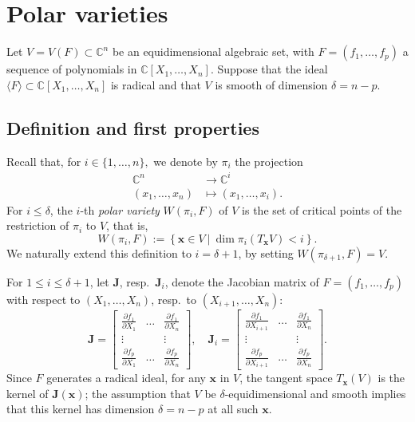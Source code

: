 \documentclass[12pt]{article}
\def\xb{{\bm x}}
\def\pa{\partial}
\def\C{\mathbb{C}}
\def\Wi{W(\pi_i,F)}
\begin{document}
\section{Polar varieties}

Let $V=V(F)\subset \C^n$ be an equidimensional algebraic set, with $F
= (f_1,\hdots,f_p)$ a sequence of polynomials in
$\C[X_1,\hdots,X_n]$. Suppose that the ideal $\langle F \rangle
\subset \C[X_1,\hdots,X_n]$ is radical and that $V$ is smooth of
dimension $\delta= n-p$.


\subsection{Definition and first properties}

Recall that, for $i \in \{1,\hdots,n\},$ we denote by $\pi_i$ the
projection
%
\begin{align*}
  \C^n &\rightarrow \C^i \\
  (x_1,\hdots,x_n) &\mapsto  (x_1,\hdots,x_i).    
\end{align*} 
For $i \le \delta$, the $i$-th \textit{polar variety} $\Wi$ of $V$ is
the set of critical points of the restriction of $\pi_i$ to $V$, that
is,
\[\Wi := \left\{\xb \in V~|~\dim \pi_i(T_\xb V) < i\right\}.\]
We naturally extend this definition to $i=\delta+1$, by setting
$W(\pi_{\delta+1},F)=V$.

For $1\le i \le \delta+1$, let $\bm J$, resp.\ $\bm J_i$, denote the
Jacobian matrix of $F=(f_1,\hdots,f_p)$ with respect to
$(X_{1},\hdots,X_n)$, resp.\ to $(X_{i+1},\hdots,X_n):$
\[
\bm J=
\left[ 
\begin{array}{ccc}
\frac{\pa f_1}{\pa X_{1}}&\hdots& \frac{\pa f_1}{\pa X_{n}} \\
\vdots& &\vdots\\
\frac{\pa f_p}{\pa X_{1}}&\hdots& \frac{\pa f_p}{\pa X_{n}} 
\end{array}
\right ],
\quad
\bm J_i=
\left[ 
\begin{array}{ccc}
\frac{\pa f_1}{\pa X_{i+1}}&\hdots& \frac{\pa f_1}{\pa X_{n}} \\
\vdots& &\vdots\\
\frac{\pa f_p}{\pa X_{i+1}}&\hdots& \frac{\pa f_p}{\pa X_{n}} 
\end{array}
\right]. 
\]
Since $F$ generates a radical ideal, for any $\xb$ in $V$, the tangent
space $T_\xb(V)$ is the kernel of $\bm J(\xb)$; the assumption that
$V$ be $\delta$-equidimensional and smooth implies that this kernel
has dimension $\delta=n-p$ at all such $\xb$.
\end{document}
